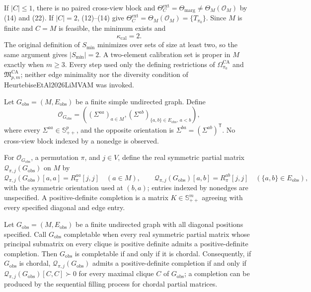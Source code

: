 If \(|C|\le1\), there is no paired cross-view block and \(\Theta_C^{\mathrm{ext}}=\Theta_{\mathrm{marg}}\ne\Theta_M(\mathcal O_M)\) by (14) and (22).  If \(|C|=2\), (12)--(14) give \(\Theta_C^{\mathrm{ext}}=\Theta_M(\mathcal O_M)=\{T_{\pi_0}\}\).  Since \(M\) is finite and \(C=M\) is feasible, the minimum exists and
\[
\kappa_{\mathrm{cal}}=2.
\tag{23}
\]
The original definition of \(S_{\min}\) minimizes over sets of size at least two, so the same argument gives \(|S_{\min}|=2\).  A two-element calibration set is proper in \(M\) exactly when \(m\ge3\).  Every step used only the defining restrictions of \(\Omega_{\pi_0}^{\mathrm{CA}}\) and \(\mathfrak M_{p,m}^{\mathrm{CA}}\); neither edge minimality nor the diversity condition of HeurtebiseEtAl2026LiMVAM was invoked.

Let \(G_{\mathrm{obs}}=(M,E_{\mathrm{obs}})\) be a finite simple undirected graph.  Define
\[
\mathcal O_{G_{\mathrm{obs}}}
=\left((\Sigma^{aa})_{a\in M},
(\Sigma^{ab})_{\{a,b\}\in E_{\mathrm{obs}},\,a<b}\right),
\]
where every \(\Sigma^{aa}\in\mathbb S_{++}^p\), and the opposite orientation is \(\Sigma^{ba}=(\Sigma^{ab})^{\mathsf T}\).  No cross-view block indexed by a nonedge is observed.

For \(\mathcal O_{G_{\mathrm{obs}}}\), a permutation \(\pi\), and \(j\in V\), define the real symmetric partial matrix \(\mathcal Q_{\pi,j}(G_{\mathrm{obs}})\) on \(M\) by
\[
\mathcal Q_{\pi,j}(G_{\mathrm{obs}})[a,a]=R_\pi^{aa}[j,j]
\quad(a\in M),
\qquad
\mathcal Q_{\pi,j}(G_{\mathrm{obs}})[a,b]
=R_\pi^{ab}[j,j]
\quad(\{a,b\}\in E_{\mathrm{obs}}),
\]
with the symmetric orientation used at \((b,a)\); entries indexed by nonedges are unspecified.  A positive-definite completion is a matrix \(K\in\mathbb S_{++}^m\) agreeing with every specified diagonal and edge entry.

Let \(G_{\mathrm{obs}}=(M,E_{\mathrm{obs}})\) be a finite undirected graph with all diagonal positions specified.  Call \(G_{\mathrm{obs}}\) completable when every real symmetric partial matrix whose principal submatrix on every clique is positive definite admits a positive-definite completion.  Then \(G_{\mathrm{obs}}\) is completable if and only if it is chordal.  Consequently, if \(G_{\mathrm{obs}}\) is chordal, \(\mathcal Q_{\pi,j}(G_{\mathrm{obs}})\) admits a positive-definite completion if and only if \(\mathcal Q_{\pi,j}(G_{\mathrm{obs}})[C,C]\succ0\) for every maximal clique \(C\) of \(G_{\mathrm{obs}}\); a completion can be produced by the sequential filling process for chordal partial matrices.


